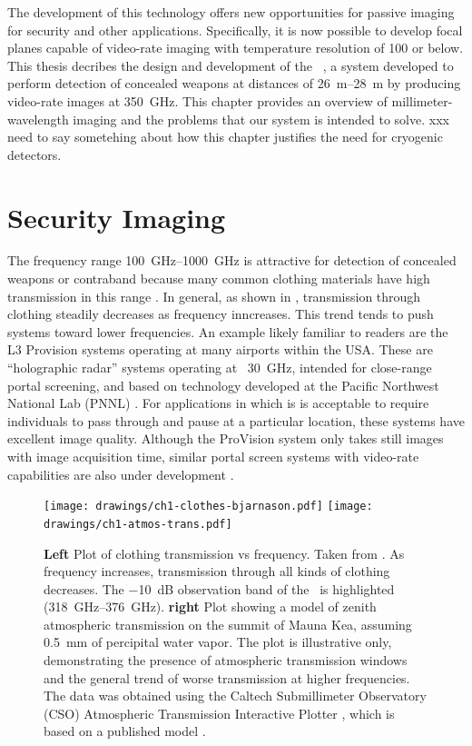 The development of this technology offers new opportunities for passive imaging for security and other applications.
Specifically, it is now possible to develop focal planes capable of video-rate imaging with temperature resolution of \SI{100}{\mK} or below.
This thesis decribes the design and development of the \NIST\ \Imager, a system developed to perform detection of concealed weapons at distances of \SIrange{26}{28}{\m} by producing video-rate images at \SI{350}{\GHz}.
This chapter provides an overview of millimeter-wavelength imaging and the problems that our system is intended to solve.
xxx need to say sometehing about how this chapter justifies the need for cryogenic detectors.

\section{Security Imaging}

The frequency range \SIrange{100}{1000}{\GHz} is attractive for detection of concealed weapons or contraband because many common clothing materials have high transmission in this range \cite{bjarnason_millimeter-wave_2004}.
In general, as shown in , transmission through clothing steadily decreases as frequency inncreases.
This trend tends to push systems toward lower frequencies.
An example likely familiar to readers are the L3 Provision systems operating at many airports within the USA.
These are ``holographic radar'' systems operating at ~\SI{30}{\GHz}, intended for close-range portal screening, and based on technology developed at the Pacific Northwest National Lab (PNNL) \cite{sheen_cylindrical_1998,mcmakin_dual-surface_2009}.
For applications in which is is acceptable to require individuals to pass through and pause at a particular location, these systems have excellent image quality.
Although the ProVision system only takes still images with  image acquisition time, similar portal screen systems with video-rate capabilities are also under development \cite{lyons_reflect-array_2013}.

\begin{figure}
\centering
\texttt{[image: drawings/ch1-clothes-bjarnason.pdf]}
\texttt{[image: drawings/ch1-atmos-trans.pdf]}
\caption[Clothing and Atmospheric Transmission vs Frequency]{
  \textbf{Left}
  Plot of clothing transmission vs frequency.
  Taken from \cite{bjarnason_millimeter-wave_2004}.
  As frequency increases, transmission through all kinds of clothing decreases.
  The \SI{-10}{\dB} observation band of the \Imager\ is highlighted (\SIrange{318}{376}{\GHz}).
  \textbf{right}
  Plot showing a model of zenith atmospheric transmission on the summit of Mauna Kea, assuming \SI{0.5}{\mm} of percipital water vapor.
  The plot is illustrative only, demonstrating the presence of atmospheric transmission windows and the general trend of worse transmission at higher frequencies.
  The data was obtained using the Caltech Submillimeter Observatory (CSO) Atmospheric Transmission Interactive Plotter \cite{darek_lis_cso_????}, which is based on a published model \cite{pardo_atmospheric_2001}.
}
\label{fig:ch1-clothes-atmos-trans}
\end{figure}

